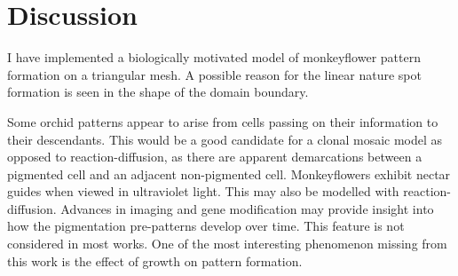 \section{Discussion}

I have implemented a biologically motivated model of monkeyflower pattern formation on a triangular mesh. A possible reason for the linear nature spot formation is seen in the shape of the domain boundary. 

Some orchid patterns appear to arise from cells passing on their information to their descendants. This would be a good candidate for a clonal mosaic \cite{korn2007} model as opposed to reaction-diffusion, as there are apparent demarcations between a pigmented cell and an adjacent non-pigmented cell. Monkeyflowers exhibit nectar guides when viewed in ultraviolet light. This may also be modelled with reaction-diffusion. Advances in imaging and gene modification may provide insight into how the pigmentation pre-patterns develop over time. This feature is not considered in most works. One of the most interesting phenomenon missing from this work is the effect of growth on pattern formation.